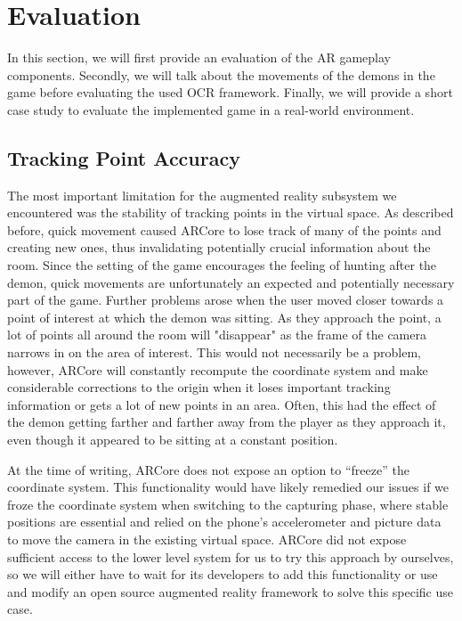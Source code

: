 \section{Evaluation}
\label{sec:evaluation}

In this section, we will first provide an evaluation of the AR gameplay components.
Secondly, we will talk about the movements of the demons in the game before evaluating the used OCR framework.
Finally, we will provide a short case study to evaluate the implemented game in a real-world environment.

\subsection{Tracking Point Accuracy}
The most important limitation for the augmented reality subsystem we encountered was the stability of tracking points in the virtual space.
As described before, quick movement caused ARCore to lose track of many of the points and creating new ones, thus invalidating potentially crucial information about the room.
Since the setting of the game encourages the feeling of hunting after the demon, quick movements are unfortunately an expected and potentially necessary part of the game.
Further problems arose when the user moved closer towards a point of interest at which the demon was sitting.
As they approach the point, a lot of points all around the room will "disappear" as the frame of the camera narrows in on the area of interest.
This would not necessarily be a problem, however, ARCore will constantly recompute the coordinate system and make considerable corrections to the origin when it loses important tracking information or gets a lot of new points in an area.
Often, this had the effect of the demon getting farther and farther away from the player as they approach it, even though it appeared to be sitting at a constant position.

At the time of writing, ARCore does not expose an option to \enquote{freeze} the coordinate system.
This functionality would have likely remedied our issues if we froze the coordinate system when switching to the capturing phase, where stable positions are essential and relied on the phone's accelerometer and picture data to move the camera in the existing virtual space.
ARCore did not expose sufficient access to the lower level system for us to try this approach by ourselves, so we will either have to wait for its developers to add this functionality or use and modify an open source augmented reality framework to solve this specific use case.

